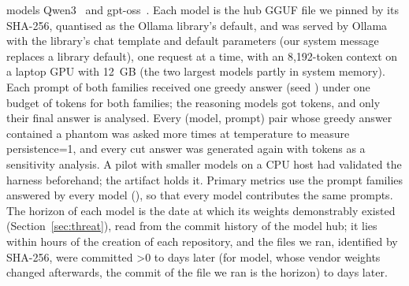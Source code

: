 \documentclass[conference]{IEEEtran}
\newif\ifpilot     \pilotfalse      %
\providecommand{\rHasExt}{0}\providecommand{\rFamEqualBudget}{0}\providecommand{\rCutText}{0}\providecommand{\rPersistUnasked}{0}
\begin{document}
models Qwen3~\cite{yang2025qwen3} and gpt-oss~\cite{openai2025gptoss}. Each model is the hub GGUF file we pinned by
its SHA-256, quantised as the Ollama library's default, and was served by Ollama~\rOllamaVersion{} with the library's
chat template and default parameters (our system message replaces a library default), one request at a time, with
an 8{,}192-token context on a laptop GPU with 12~GB (the two largest models partly in system memory). Each prompt of both families received one greedy answer (seed \rGenSeed) under one budget of
\rBudgetMin{} tokens for both families; the reasoning models got \rBudgetMax{} tokens, and only their final answer is
analysed. Every (model, prompt) pair whose greedy answer contained a phantom was asked \rResampleN{} more times at
temperature \rResampleTemp{} to measure persistence\ifnum\rHasExt=1, and every cut answer was generated again with
\rExtBudget{} tokens as a sensitivity analysis\fi. A pilot with smaller models on a CPU host had validated the harness
beforehand; the artifact holds it.
\fi
Primary metrics use the prompt families answered by every model (\rFamilies), so that every model contributes the same
prompts. The horizon of each model is the date at which its weights demonstrably existed (Section~\ref{sec:threat}),
read from the commit history of the model hub; it lies within \rHorizonGapMaxH{} hours of the creation of each
repository, and the files we ran, identified by SHA-256, were committed \ifnum\rNGgufIsHorizon>0 \rGgufGapLaterMinD{} to
\rGgufGapMaxD{} days later (for \rNGgufIsHorizon{} model, whose vendor weights changed afterwards, the commit of the
file we ran is the horizon)\else\rGgufGapMinD{} to \rGgufGapMaxD{} days later\fi.

\begin{table}[t]
\centering
\caption{\ifpilot Pilot models (primary family)\else Models (primary families)\fi: horizon $h$, token budget, answers
cut by it, and yield (answers with an executable declaration); Table~\ref{tab:prevalence} gives their phantom rates.}
\label{tab:models}
\footnotesize
\setlength{\tabcolsep}{4pt}

\end{table}
\end{document}
